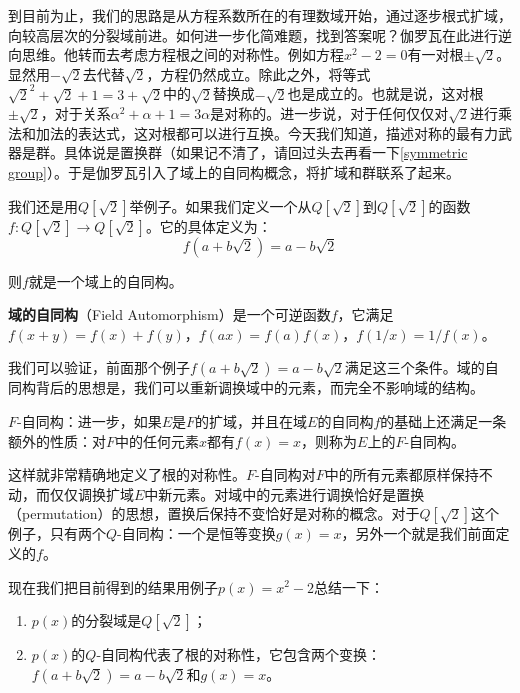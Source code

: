 \documentclass{article}
\begin{document}
到目前为止，我们的思路是从方程系数所在的有理数域开始，通过逐步根式扩域，向较高层次的分裂域前进。如何进一步化简难题，找到答案呢？伽罗瓦在此进行逆向思维。他转而去考虑方程根之间的对称性。例如方程$x^2 - 2 = 0$有一对根$\pm \sqrt{2}$。显然用$-\sqrt{2}$去代替$\sqrt{2}$，方程仍然成立。除此之外，将等式$\sqrt{2}^2 + \sqrt{2} + 1 = 3 + \sqrt{2}$中的$\sqrt{2}$替换成$-\sqrt{2}$也是成立的。也就是说，这对根$\pm \sqrt{2}$，对于关系$\alpha^2 + \alpha + 1 = 3\alpha$是对称的。进一步说，对于任何仅仅对$\sqrt{2}$进行乘法和加法的表达式，这对根都可以进行互换。今天我们知道，描述对称的最有力武器是群。具体说是置换群（如果记不清了，请回过头去再看一下\ref{symmetric group}）。于是伽罗瓦引入了域上的自同构概念，将扩域和群联系了起来。

我们还是用$Q[\sqrt{2}]$举例子。如果我们定义一个从$Q[\sqrt{2}]$到$Q[\sqrt{2}]$的函数$f: Q[\sqrt{2}] \to Q[\sqrt{2}]$。它的具体定义为：
\[
f(a + b \sqrt{2}) = a - b \sqrt{2}
\]

则$f$就是一个域上的自同构。

\begin{definition}
\textbf{域的自同构}（Field Automorphism）是一个可逆函数$f$，它满足$f(x + y) = f(x) + f(y)$，$f(ax) = f(a) f(x)$，$f(1/x) = 1/f(x)$。
\end{definition}

我们可以验证，前面那个例子$f(a + b \sqrt{2}) = a - b \sqrt{2}$满足这三个条件。域的自同构背后的思想是，我们可以重新调换域中的元素，而完全不影响域的结构。

\begin{definition}
$F$-自同构：进一步，如果$E$是$F$的扩域，并且在域$E$的自同构$f$的基础上还满足一条额外的性质：对$F$中的任何元素$x$都有$f(x) = x$，则称为$E$上的$F$-自同构。
\end{definition}

这样就非常精确地定义了根的对称性。$F$-自同构对$F$中的所有元素都原样保持不动，而仅仅调换扩域$E$中新元素。对域中的元素进行调换恰好是置换（permutation）的思想，置换后保持不变恰好是对称的概念。对于$Q[\sqrt{2}]$这个例子，只有两个$Q$-自同构：一个是恒等变换$g(x) = x$，另外一个就是我们前面定义的$f$。

现在我们把目前得到的结果用例子$p(x) = x^2 - 2$总结一下：

\begin{enumerate}
\item $p(x)$的分裂域是$Q[\sqrt{2}]$；
\item $p(x)$的$Q$-自同构代表了根的对称性，它包含两个变换：$f(a + b\sqrt{2}) = a - b\sqrt{2}$和$g(x) = x$。
\end{enumerate}
\end{document}
